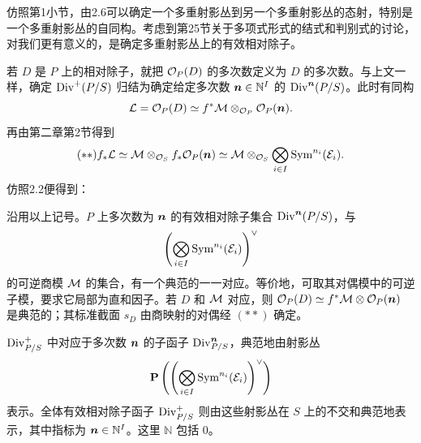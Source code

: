 仿照第1小节，由2.6可以确定一个多重射影丛到另一个多重射影丛的态射，特别是一个多重射影丛的自同构。考虑到第25节关于多项式形式的结式和判别式的讨论，对我们更有意义的，是确定多重射影丛上的有效相对除子。


若 \(D\) 是 \(P\) 上的相对除子，就把 \(\mathcal O_P(D)\) 的多次数定义为 \(D\) 的多次数。与上文一样，确定 \(\operatorname{Div}^+(P/S)\) 归结为确定给定多次数 \(\boldsymbol n\in\mathbb N^I\) 的 \(\operatorname{Div}^{\boldsymbol n}(P/S)\)。此时有同构
\[
 \mathcal L=\mathcal O_P(D)\simeq f^*\mathcal M\otimes_{\mathcal O_P}\mathcal O_P(\boldsymbol n).
\]
再由第二章第2节得到
\[
 (**)
 f_*\mathcal L\simeq\mathcal M\otimes_{\mathcal O_S} f_*\mathcal O_P(\boldsymbol n)
       \simeq\mathcal M\otimes_{\mathcal O_S}
                \bigotimes_{i\in I}\operatorname{Sym}^{n_i}(\mathcal E_i).
\]
仿照2.2便得到：


沿用以上记号。\(P\) 上多次数为 \(\boldsymbol n\) 的有效相对除子集合 \(\operatorname{Div}^{\boldsymbol n}(P/S)\)，与
\[
 \left(\bigotimes_{i\in I}\operatorname{Sym}^{n_i}(\mathcal E_i)\right)^\vee
\]
的可逆商模 \(\mathcal M\) 的集合，有一个典范的一一对应。等价地，可取其对偶模中的可逆子模，要求它局部为直和因子。若 \(D\) 和 \(\mathcal M\) 对应，则
\(\mathcal O_P(D)\simeq f^*\mathcal M\otimes\mathcal O_P(\boldsymbol n)\)
是典范的；其标准截面 \(s_D\) 由商映射的对偶经 \((**)\) 确定。


\(\operatorname{Div}^+_{P/S}\) 中对应于多次数 \(\boldsymbol n\) 的子函子 \(\operatorname{Div}^{\boldsymbol n}_{P/S}\)，典范地由射影丛
\[
 \mathbf P\left(
 \left(\bigotimes_{i\in I}\operatorname{Sym}^{n_i}(\mathcal E_i)\right)^\vee
 \right)
\]
表示。全体有效相对除子函子 \(\operatorname{Div}^+_{P/S}\) 则由这些射影丛在 \(S\) 上的不交和典范地表示，其中指标为 \(\boldsymbol n\in\mathbb N^I\)。这里 \(\mathbb N\) 包括 \(0\)。
\par\endgroup
